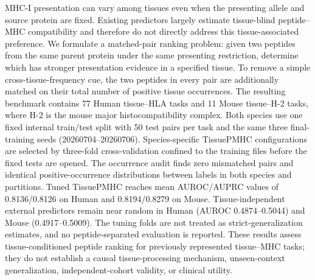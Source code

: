 MHC-I presentation can vary among tissues even when the presenting allele and source protein are fixed. Existing predictors largely estimate tissue-blind peptide--MHC compatibility and therefore do not directly address this tissue-associated preference. We formulate a matched-pair ranking problem: given two peptides from the same parent protein under the same presenting restriction, determine which has stronger presentation evidence in a specified tissue. To remove a simple cross-tissue-frequency cue, the two peptides in every pair are additionally matched on their total number of positive tissue occurrences. The resulting benchmark contains 77 Human tissue--HLA tasks and 11 Mouse tissue--H-2 tasks, where H-2 is the mouse major histocompatibility complex. Both species use one fixed internal train/test split with 50 test pairs per task and the same three final-training seeds (20260704--20260706). Species-specific TissuePMHC configurations are selected by three-fold cross-validation confined to the training files before the fixed tests are opened. The occurrence audit finds zero mismatched pairs and identical positive-occurrence distributions between labels in both species and partitions. Tuned TissuePMHC reaches mean AUROC/AUPRC values of 0.8136/0.8126 on Human and 0.8194/0.8279 on Mouse. Tissue-independent external predictors remain near random in Human (AUROC 0.4874--0.5044) and Mouse (0.4917--0.5009). The tuning folds are not treated as strict-generalization estimates, and no peptide-separated evaluation is reported. These results assess tissue-conditioned peptide ranking for previously represented tissue--MHC tasks; they do not establish a causal tissue-processing mechanism, unseen-context generalization, independent-cohort validity, or clinical utility.
